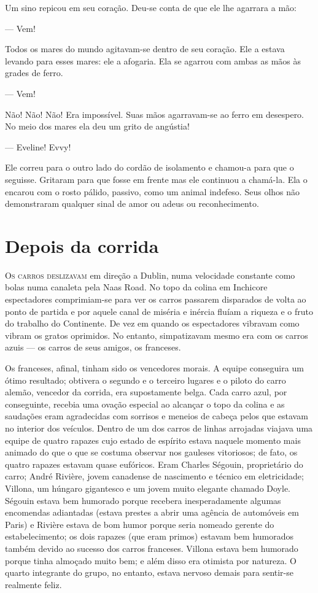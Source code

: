 Um sino repicou em seu coração.  Deu-se conta de que ele lhe agarrara a mão:

--- Vem!

Todos os mares do mundo agitavam-se dentro de seu coração.  Ele a estava
levando para esses mares: ele a afogaria.  Ela se agarrou com ambas as mãos às
grades de ferro.

--- Vem!

Não! Não! Não!  Era impossível.  Suas mãos agarravam-se ao ferro em desespero.
No meio dos mares ela deu um grito de angústia!

--- Eveline!  Evvy!

Ele correu para o outro lado do cordão de isolamento e chamou-a para que o
seguisse.  Gritaram para que fosse em frente mas ele continuou a chamá-la.  Ela
o encarou com o rosto pálido, passivo, como um animal indefeso.  Seus olhos não
demonstraram qualquer sinal de amor ou adeus ou reconhecimento.


\chapter{Depois da corrida}

\textsc{Os carros deslizavam} em direção a Dublin, numa velocidade constante
como bolas numa canaleta pela Naas Road.  No topo da colina em Inchicore
espectadores comprimiam-se para ver os carros passarem disparados de volta ao
ponto de partida e por aquele canal de miséria e inércia fluíam a riqueza e o
fruto do trabalho do Continente.  De vez em quando os espectadores vibravam
como vibram os gratos oprimidos.  No entanto, simpatizavam mesmo era com os
carros azuis --- os carros de seus amigos, os franceses.

Os franceses, afinal, tinham sido os vencedores morais.  A equipe conseguira um
ótimo resultado; obtivera o segundo e o terceiro lugares e o piloto do carro
alemão, vencedor da corrida, era supostamente belga.  Cada carro azul, por
conseguinte, recebia uma ovação especial ao alcançar o topo da colina e as
saudações eram agradecidas com sorrisos e meneios de cabeça pelos que estavam
no interior dos veículos.  Dentro de um dos carros de linhas arrojadas viajava
uma equipe de quatro rapazes cujo estado de espírito estava naquele momento
mais animado do que o que se costuma observar nos gauleses vitoriosos; de fato,
os quatro rapazes estavam quase eufóricos.  Eram Charles Ségouin, proprietário
do carro; André Rivière, jovem canadense de nascimento e técnico em
eletricidade; Villona, um húngaro gigantesco e um jovem muito elegante chamado
Doyle.  Ségouin estava bem humorado porque recebera inesperadamente algumas
encomendas adiantadas (estava prestes a abrir uma agência de automóveis em
Paris) e Rivière estava de bom humor porque seria nomeado gerente do
estabelecimento; os dois rapazes (que eram primos) estavam bem humorados também
devido ao sucesso dos carros franceses.  Villona estava bem humorado porque
tinha almoçado muito bem; e além disso era otimista por natureza.  O quarto
integrante do grupo, no entanto, estava nervoso demais para sentir-se realmente
feliz.


